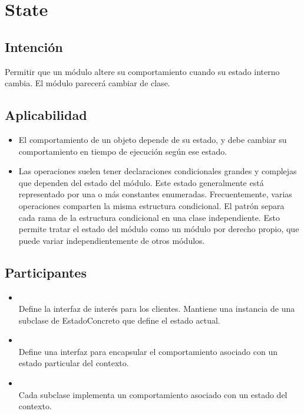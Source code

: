 \section{State}
\label{anexoState}

\subsection*{Intención}

Permitir que un módulo altere su comportamiento cuando su estado interno cambia. El módulo parecerá cambiar de clase.

\subsection*{Aplicabilidad}

\begin{itemize}
\item El comportamiento de un objeto depende de su estado, y debe cambiar su comportamiento en tiempo de ejecución según ese estado.
\item Las operaciones suelen tener declaraciones condicionales grandes y complejas que dependen del estado del módulo. Este estado generalmente está representado por una o más constantes enumeradas. Frecuentemente, varias operaciones comparten la misma estructura condicional. El patrón separa cada rama de la estructura condicional en una clase independiente. Esto permite tratar el estado del módulo como un módulo por derecho propio, que puede variar independientemente de otros módulos.
\end{itemize}

\subsection*{Participantes}

\begin{itemize}
\item \Contexto\\
Define la interfaz de interés para los clientes. Mantiene una instancia de una subclase de EstadoConcreto que define el estado actual.

\item \Estado\\
Define una interfaz para encapsular el comportamiento asociado con un estado particular del contexto.

\item \EstadoConcreto\\
Cada subclase implementa un comportamiento asociado con un estado del contexto.
\end{itemize}


